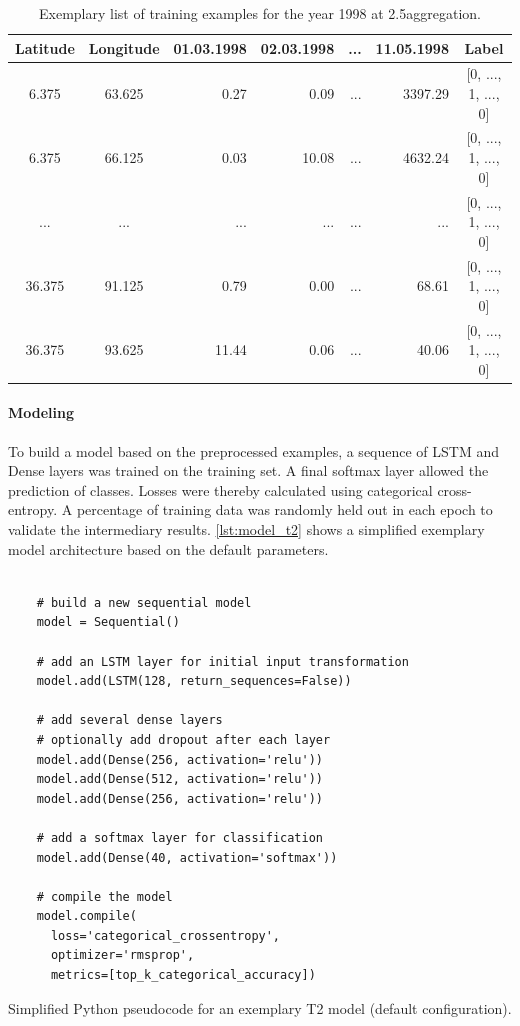 \begin{table}[h]
  \centering
  \begin{tabular}{ccrrrr|c}
    \toprule
    \textbf{Latitude} & \textbf{Longitude} & \textbf{01.03.1998} & \textbf{02.03.1998} & \textbf{...} & \textbf{11.05.1998} & \textbf{Label} \\
    \midrule
    6.375 & 63.625 & 0.27 & 0.09 & ... & 3397.29 & [0, ..., 1, ..., 0] \\
    6.375 & 66.125 & 0.03 & 10.08 & ... & 4632.24 & [0, ..., 1, ..., 0] \\
    ... & ... & ... & ... & ... & ... & [0, ..., 1, ..., 0] \\
    36.375 & 91.125 & 0.79 & 0.00 & ... & 68.61 & [0, ..., 1, ..., 0] \\
    36.375 & 93.625 & 11.44 & 0.06 & ... & 40.06 & [0, ..., 1, ..., 0] \\
    \bottomrule
  \end{tabular}
  \caption{Exemplary list of training examples for the year 1998 at 2.5\degree aggregation.}
  \label{tab:nn_t2_data}
\end{table}

\paragraph{Modeling}
\label{ssst:nn_t2_model}
To build a model based on the preprocessed examples, a sequence of LSTM and Dense layers was trained on the training set. A final softmax layer allowed the prediction of classes. Losses were thereby calculated using categorical cross-entropy. A percentage of training data was randomly held out in each epoch to validate the intermediary results. \cref{lst:model_t2} shows a simplified exemplary model architecture based on the default parameters.

\begin{listing}[h]
  \begin{verbatim}

    # build a new sequential model
    model = Sequential()

    # add an LSTM layer for initial input transformation
    model.add(LSTM(128, return_sequences=False))

    # add several dense layers
    # optionally add dropout after each layer
    model.add(Dense(256, activation='relu'))
    model.add(Dense(512, activation='relu'))
    model.add(Dense(256, activation='relu'))

    # add a softmax layer for classification
    model.add(Dense(40, activation='softmax'))

    # compile the model
    model.compile(
      loss='categorical_crossentropy',
      optimizer='rmsprop',
      metrics=[top_k_categorical_accuracy])

  \end{verbatim}
  \caption{Simplified Python pseudocode for an exemplary T2 model (default configuration).}
  \label{lst:model_t2}
\end{listing}


